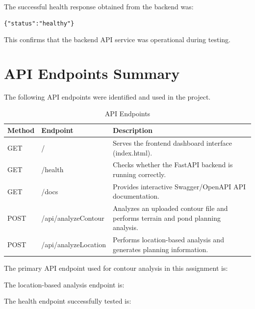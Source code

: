 \documentclass[12pt,a4paper]{article}
\begin{document}
The successful health response obtained from the backend was:
\begin{verbatim}
{"status":"healthy"}
\end{verbatim}
This confirms that the backend API service was operational during testing.

\section{API Endpoints Summary}

The following API endpoints were identified and used in the project.

\begin{table}[H]
\centering
\caption{API Endpoints}
\begin{tabular}{p{2cm} p{5cm} p{8cm}}
\toprule
\textbf{Method} & \textbf{Endpoint} & \textbf{Description} \\
\midrule
GET & / & Serves the frontend dashboard interface (index.html). \\
GET & /health & Checks whether the FastAPI backend is running correctly. \\
GET & /docs & Provides interactive Swagger/OpenAPI API documentation. \\
POST & /api/analyzeContour & Analyzes an uploaded contour file and performs terrain and pond planning analysis. \\
POST & /api/analyzeLocation & Performs location-based analysis and generates planning information. \\
\bottomrule
\end{tabular}
\end{table}

The primary API endpoint used for contour analysis in this assignment is:

\begin{center}
\end{center}

The location-based analysis endpoint is:

\begin{center}
\end{center}

The health endpoint successfully tested is:

\begin{center}
\end{center}
\end{document}
